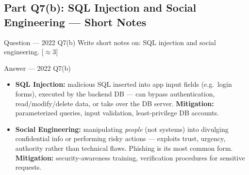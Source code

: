 \documentclass[12pt,a4paper]{article}
\begin{document}
\subsection{Part Q7(b): SQL Injection and Social Engineering --- Short Notes}
\begin{qbox}{Question --- 2022 Q7(b)}
Write short notes on: SQL injection and social engineering. \hfill [$\approx$3]
\end{qbox}
\begin{solbox}{Answer --- 2022 Q7(b)}
\begin{itemize}[noitemsep]
  \item \textbf{SQL Injection:} malicious SQL inserted into app input fields (e.g.\ login forms), executed by the backend DB --- can bypass authentication, read/modify/delete data, or take over the DB server. \textbf{Mitigation:} parameterized queries, input validation, least-privilege DB accounts.
  \item \textbf{Social Engineering:} manipulating \emph{people} (not systems) into divulging confidential info or performing risky actions --- exploits trust, urgency, authority rather than technical flaws. Phishing is its most common form. \textbf{Mitigation:} security-awareness training, verification procedures for sensitive requests.
\end{itemize}
\end{solbox}
\end{document}
